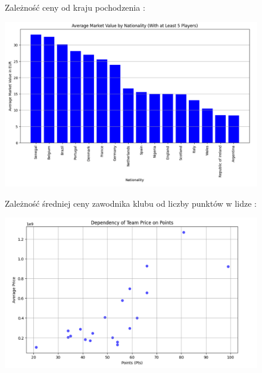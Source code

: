 \documentclass{article}
\begin{document}
\begin{figure}[H]
    \centering
        \begin{minipage}{0.5\textwidth} 
        \centering Zależność ceny od kraju pochodzenia :
    \end{minipage}
    \begin{minipage}{1\textwidth} 
        \includegraphics[width=\linewidth]{nationality.png} 
        \label{fig:zdjecie}
    \end{minipage}
    \hfill 

\end{figure}

\begin{figure}[H]
    \centering
        \begin{minipage}{0.5\textwidth} 
        \centering Zależność średniej ceny zawodnika klubu od liczby punktów w lidze :
    \end{minipage}
    \begin{minipage}{1\textwidth} 
        \includegraphics[width=\linewidth]{price.png} 
        \label{fig:zdjecie}
    \end{minipage}
    \hfill 

\end{figure}
\end{document}
